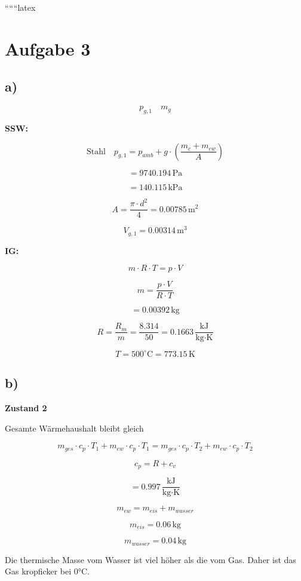 
``````latex


\section*{Aufgabe 3}

\subsection*{a)}

\[
p_{g,1} \quad m_{g}
\]

\textbf{SSW:}

\[
\text{Stahl} \quad p_{g,1} = p_{amb} + g \cdot \left( \frac{m_c + m_{ew}}{A} \right)
\]

\[
= 9740.194 \, \text{Pa}
\]

\[
= 140.115 \, \text{kPa}
\]

\[
A = \frac{\pi \cdot d^2}{4} = 0.00785 \, \text{m}^2
\]

\[
V_{g,1} = 0.00314 \, \text{m}^3
\]

\textbf{IG:}

\[
m \cdot R \cdot T = p \cdot V
\]

\[
m = \frac{p \cdot V}{R \cdot T}
\]

\[
= 0.00392 \, \text{kg}
\]

\[
R = \frac{R_m}{m} = \frac{8.314}{50} = 0.1663 \, \frac{\text{kJ}}{\text{kg} \cdot \text{K}}
\]

\[
T = 500^\circ \text{C} = 773.15 \, \text{K}
\]

\subsection*{b)}

\textbf{Zustand 2}

Gesamte Wärmehaushalt bleibt gleich

\[
m_{ges} \cdot c_{p} \cdot T_1 + m_{ew} \cdot c_p \cdot T_1 = m_{ges} \cdot c_p \cdot T_2 + m_{ew} \cdot c_p \cdot T_2
\]

\[
c_p = R + c_v
\]

\[
= 0.997 \, \frac{\text{kJ}}{\text{kg} \cdot \text{K}}
\]

\[
m_{ew} = m_{eis} + m_{wasser}
\]

\[
m_{eis} = 0.06 \, \text{kg}
\]

\[
m_{wasser} = 0.04 \, \text{kg}
\]

Die thermische Masse vom Wasser ist viel höher als die vom Gas. Daher ist das Gas kropficker bei 0°C.


